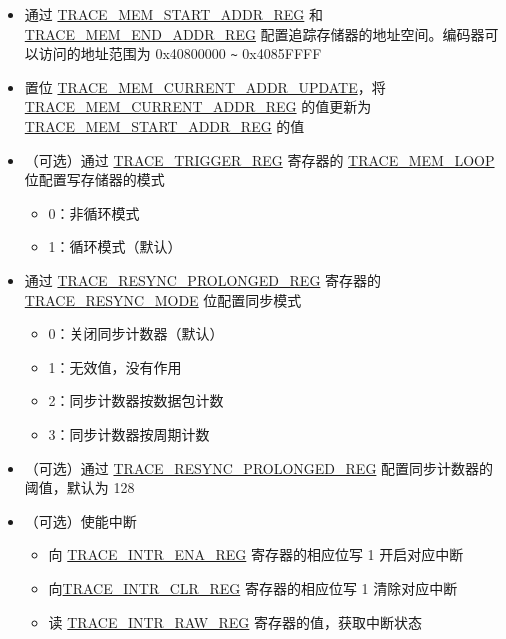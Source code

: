 \documentclass[main\_\_CN.tex]{subfiles}
\begin{document}
\begin{itemize}
    \item 通过 \hyperref[regdesc:TRACEMEMSTARTADDRREG]{TRACE\_MEM\_START\_ADDR\_REG} 和 \hyperref[regdesc:TRACEMEMENDADDRREG]{TRACE\_MEM\_END\_ADDR\_REG} 配置追踪存储器的地址空间。编码器可以访问的地址范围为 0x40800000 \verb+~+ 0x4085FFFF
    \item 置位 \hyperref[fielddesc:TRACEMEMCURRENTADDRUPDATE]{TRACE\_MEM\_CURRENT\_ADDR\_UPDATE}，将 \hyperref[regdesc:TRACEMEMCURRENTADDRREG]{TRACE\_MEM\_CURRENT\_ADDR\_REG} 的值更新为 \hyperref[regdesc:TRACEMEMSTARTADDRREG]{TRACE\_MEM\_START\_ADDR\_REG} 的值

    \item（可选）通过 \hyperref[regdesc:TRACETRIGGERREG]{TRACE\_TRIGGER\_REG} 寄存器的 \hyperref[fielddesc:TRACEMEMLOOP]{TRACE\_MEM\_LOOP} 位配置写存储器的模式
        \begin{itemize}
            \item 0：非循环模式
            \item 1：循环模式（默认）
        \end{itemize}

    \item 通过 \hyperref[regdesc:TRACERESYNCPROLONGEDREG]{TRACE\_RESYNC\_PROLONGED\_REG} 寄存器的 \hyperref[fielddesc:TRACERESYNCMODE]{TRACE\_RESYNC\_MODE} 位配置同步模式
        \begin{itemize}
            \item 0：关闭同步计数器（默认）
            \item 1：无效值，没有作用
            \item 2：同步计数器按数据包计数
            \item 3：同步计数器按周期计数
                \end{itemize}

    \item（可选）通过 \hyperref[regdesc:TRACERESYNCPROLONGEDREG]{TRACE\_RESYNC\_PROLONGED\_REG} 配置同步计数器的阈值，默认为 128

    \item（可选）使能中断
        \begin{itemize}
            \item 向 \hyperref[regdesc:TRACEINTRENAREG]{TRACE\_INTR\_ENA\_REG} 寄存器的相应位写 1 开启对应中断
            \item 向\hyperref[regdesc:TRACEINTRCLRREG]{TRACE\_INTR\_CLR\_REG} 寄存器的相应位写 1 清除对应中断
            \item 读 \hyperref[regdesc:TRACEINTRRAWREG]{TRACE\_INTR\_RAW\_REG} 寄存器的值，获取中断状态
        \end{itemize}


\end{itemize}
\end{document}

